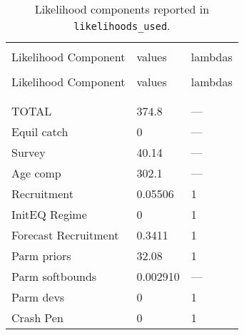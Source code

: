 \clearpage

\setlength{\tabcolsep}{0pt}
\begin{longtable}[c]{>{\raggedright\let\newline\\\arraybackslash\hspace{0pt}}p{2.31in}>{\raggedleft\let\newline\\\arraybackslash\hspace{0pt}}p{1.35in}>{\raggedleft\let\newline\\\arraybackslash\hspace{0pt}}p{1.35in}}
  \caption{Likelihood components reported in \texttt{likelihoods\_used}.} \label{tab:like1}\\  \hline\\[-2.2ex]  Likelihood Component  & values & lambdas \\[0.2ex]\hline\\[-1.5ex]  \endfirsthead   \hline  Likelihood Component  & values & lambdas \\[0.2ex]\hline\\[-1.5ex]  \endhead  \hline\\[-2.2ex]   \endfoot  \hline \endlastfoot  TOTAL & 374.8 & --- \\ 
  Equil catch & 0 & --- \\ 
  Survey & 40.14 & --- \\ 
  Age comp & 302.1 & --- \\ 
  Recruitment & 0.05506 & 1 \\ 
  InitEQ Regime & 0 & 1 \\ 
  Forecast Recruitment & 0.3411 & 1 \\ 
  Parm priors & 32.08 & 1 \\ 
  Parm softbounds & 0.002910 & --- \\ 
  Parm devs & 0 & 1 \\ 
  Crash Pen & 0 & 1 \\ 
\end{longtable}\setlength{\tabcolsep}{0pt}


